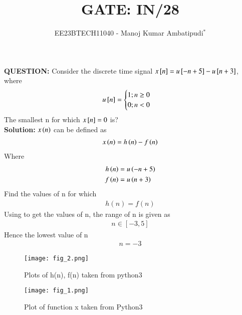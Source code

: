 \documentclass[journal,12pt,twocolumn]{IEEEtran}
\theoremstyle{remark}
\begin{document}

\vspace{3cm}
\title{GATE: IN/28}
\author{EE23BTECH11040 - Manoj Kumar Ambatipudi$^{*}$%
}
\maketitle
\newpage
\bigskip
\renewcommand{\thefigure}{\theenumi}
\renewcommand{\thetable}{\theenumi}
\textbf{QUESTION:}
Consider the discrete time signal $x{}\left[n\right] = u{}\left[-n+5\right] - u{}\left[n+3\right]$, where
\[u{}\left[n\right] = 
\begin{cases}
    1;n\geq0\\
    0;n<0
\end{cases}
\]
The smallest n for which $x{}\left[n\right] = 0$ is?\\
\textbf{Solution:}
$x\left(n\right)$ can be defined as 
\begin{align}
    x\left(n\right) = h\left(n\right) - f\left(n\right)
\end{align}
Where 
\begin{align}
    h\left(n\right) &= u\left(-n+5\right)\\
    f\left(n\right) &= u\left(n+3\right)
\end{align}
Find the values of n for which 
\begin{align}
    h(n) = f(n)
\end{align}
Using  to get the values of n, the range of n is given as
\begin{align*}
    n \in [-3,5]
\end{align*}
Hence the lowest value of n 
\begin{align}
    \boxed{n = -3}
\end{align}
\begin{figure}[h!]
\renewcommand\thefigure{1}
    \centering
    \texttt{[image: fig\_2.png]}
    \caption{Plots of h(n), f(n) taken from python3}
    \label{IN/28/fig_2}
\end{figure}
\begin{figure}[h!]
\renewcommand\thefigure{2}
    \centering
    \texttt{[image: fig\_1.png]}
    \caption{Plot of function x taken from Python3}
    \label{fig:enter-label}
\end{figure}
\end{document}
